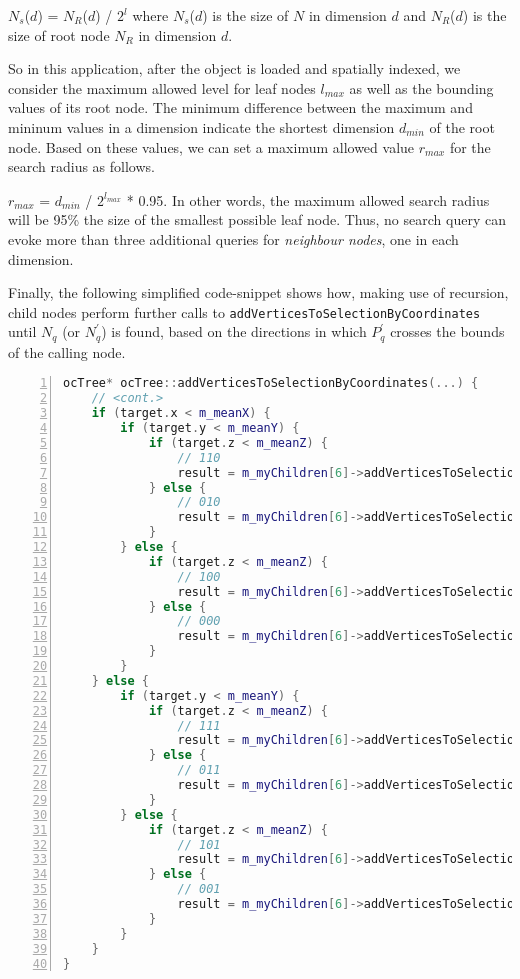 $N_s$($d$) = $N_{R}$($d$) / $2^{l}$ where $N_s$($d$) is the size of $N$ in dimension $d$ and $N_{R}$($d$) is the size of root node $N_{R}$ in dimension $d$.

So in this application, after the object is loaded and spatially indexed, we consider the maximum allowed level for leaf nodes $l_{max}$ as well as the bounding values of its root node. The minimum difference between the maximum and mininum values in a dimension indicate the shortest dimension $d_{min}$ of the root node. Based on these values, we can set a maximum allowed value $r_{max}$ for the search radius as follows.

$r_{max}$ = $d_{min}$ / $2^{l_{max}}$ * 0.95. In other words, the maximum allowed search radius will be 95\% the size of the smallest possible leaf node. Thus, no search query can evoke more than three additional queries for \textit{neighbour nodes}, one in each dimension.

Finally, the following simplified code-snippet shows how, making use of recursion, child nodes perform further calls to \texttt{addVerticesToSelectionByCoordinates} until $N_q$ (or $N_{q}^{'}$) is found, based on the directions in which $P_{q}^{'}$ crosses the bounds of the calling node.

\begin{minipage}{\linewidth}
\begin{lstlisting}[language=C++,numberstyle=\zebra{black!5}{white}{},numbers=left,xleftmargin=2em,tabsize=3]
ocTree* ocTree::addVerticesToSelectionByCoordinates(...) {
	// <cont.>
	if (target.x < m_meanX) {
		if (target.y < m_meanY) {
			if (target.z < m_meanZ) {
				// 110
				result = m_myChildren[6]->addVerticesToSelectionByCoordinates();
			} else {
				// 010
				result = m_myChildren[6]->addVerticesToSelectionByCoordinates();
			}
		} else {
			if (target.z < m_meanZ) {
				// 100
				result = m_myChildren[6]->addVerticesToSelectionByCoordinates();
			} else {
				// 000
				result = m_myChildren[6]->addVerticesToSelectionByCoordinates();
			}
		}
	} else {
		if (target.y < m_meanY) {
			if (target.z < m_meanZ) {
				// 111
				result = m_myChildren[6]->addVerticesToSelectionByCoordinates();
			} else {
				// 011
				result = m_myChildren[6]->addVerticesToSelectionByCoordinates();
			}
		} else {
			if (target.z < m_meanZ) {
				// 101
				result = m_myChildren[6]->addVerticesToSelectionByCoordinates();
			} else {
				// 001
				result = m_myChildren[6]->addVerticesToSelectionByCoordinates();
			}
		}
	}
}
\end{lstlisting}
\end{minipage}

